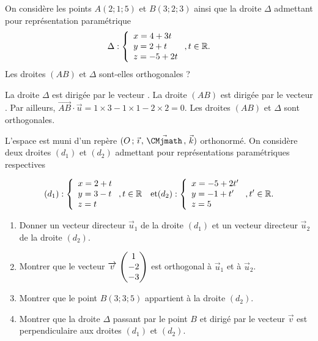 \documentclass[11pt,fleqn, openany]{book} %
\begin{document}
 

\begin{exercise}On considère les points $A(2;1;5)$ et $B(3;2;3)$ ainsi que la droite $\Delta$ admettant pour représentation paramétrique \[ \Delta : \left\{\renewcommand{\arraystretch}{1}\renewcommand{\arraystretch}{1}\begin{array}{l} x = 4 +3t \\ y = 2+t \\ z = -5+2t 

\end{array}\right. , t\in \mathbb{R}.\] Les droites $(AB)$ et $\Delta$ sont-elles orthogonales ?\end{exercise}

\begin{solution}La droite $\Delta$ est dirigée par le vecteur . La droite $(AB)$ est dirigée par le vecteur . Par ailleurs, $\overrightarrow{AB}\cdot \vec u = 1 \times 3 - 1 \times 1  -2 \times 2 = 0$. Les droites $(AB)$ et $\Delta$ sont orthogonales.\end{solution}


\begin{exercise}L'espace est muni d'un repère $\Oijk$ orthonormé. On considère deux droites $(d_1)$ et $(d_2)$ admettant pour représentations paramétriques respectives

\[ (d_1) : \left\{ \renewcommand{\arraystretch}{1}\renewcommand{\arraystretch}{1}\begin{array}{l}x=2+t \\ y=3-t \\ z=t \end{array}\right.,t \in \mathbb{R} \quad \text{et} (d_2) : \left\{ \renewcommand{\arraystretch}{1}\renewcommand{\arraystretch}{1}\begin{array}{l}x=-5+2t' \\ y=-1+t' \\ z=5 \end{array}\right.,t' \in \mathbb{R}.\]

\begin{enumerate}
\item Donner un vecteur directeur $\vec u_1$ de la droite $(d_1)$ et un vecteur directeur $\vec u_2$ de la droite $(d_2)$.
\item Montrer que le vecteur $\coorde{v}{1}{-2}{-3}$ est orthogonal à $\vec u_1$ et à $\vec u_2$.
\item Montrer que le point $B(3;3;5)$ appartient à la droite $(d_2)$.
\item Montrer que la droite $\Delta$ passant par le point $B$ et dirigé par le vecteur $\vec v$ est perpendiculaire aux droites $(d_1)$ et $(d_2)$.
\end{enumerate}\end{exercise}
\end{document}
